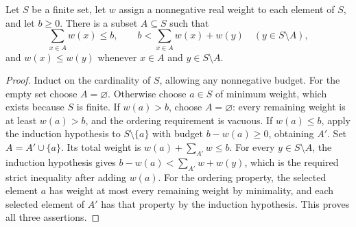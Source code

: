 \begin{lemma}
Let $S$ be a finite set, let $w$ assign a nonnegative real weight to each
element of $S$, and let $b\ge0$. There is a subset $A\subseteq S$ such that
\[
\sum_{x\in A}w(x)\le b,\qquad
b<\sum_{x\in A}w(x)+w(y)\quad(y\in S\setminus A),
\]
and $w(x)\le w(y)$ whenever $x\in A$ and $y\in S\setminus A$.
\end{lemma}
\begin{proof}
Induct on the cardinality of $S$, allowing any nonnegative budget.
For the empty set choose $A=\varnothing$. Otherwise choose $a\in S$
of minimum weight, which exists because $S$ is finite. If $w(a)>b$,
choose $A=\varnothing$: every remaining weight is at least $w(a)>b$,
and the ordering requirement is vacuous.
If $w(a)\le b$, apply the induction hypothesis to $S\setminus\{a\}$
with budget $b-w(a)\ge0$, obtaining $A'$. Set $A=A'\cup\{a\}$.
Its total weight is $w(a)+\sum_{A'}w\le b$. For every $y\in S\setminus A$,
the induction hypothesis gives $b-w(a)<\sum_{A'}w+w(y)$, which is the
required strict inequality after adding $w(a)$. For the ordering property,
the selected element $a$ has weight at most every remaining weight by
minimality, and each selected element of $A'$ has that property by the
induction hypothesis. This proves all three assertions.
\end{proof}
